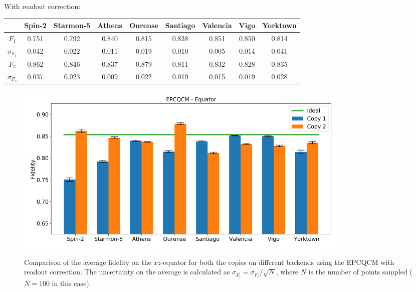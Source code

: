 With readout correction:
\begin{table}[H]
    \centering
    \begin{tabular}{|c|c|c|c|c|c|c|c|c|}
    \hline
    \textbf{} & \textbf{Spin-2} & \textbf{Starmon-5} & \textbf{Athens} & \textbf{Ourense} & \textbf{Santiago} & \textbf{Valencia} & \textbf{Vigo} & \textbf{Yorktown} \\ \hline
    $F_1$              & 0.751 & 0.792 & 0.840 & 0.815 & 0.838 & 0.851 & 0.850 & 0.814 \\ \hline
    $\sigma_{F_1}$     & 0.042 & 0.022 & 0.011 & 0.019 & 0.010 & 0.005 & 0.014 & 0.041 \\ \hline
    $F_2$              & 0.862 & 0.846 & 0.837 & 0.879 & 0.811 & 0.832 & 0.828 & 0.835 \\ \hline
    $\sigma_{F_2}$     & 0.037 & 0.023 & 0.009 & 0.022 & 0.019 & 0.015 & 0.019 & 0.028 \\ \hline
    \end{tabular}
\end{table}
\begin{figure}[H]
  \centering
          \includegraphics[width=0.8\textwidth]{Figures/Economical/Histograms/histo_equator_corrected.png}
      \label{fig:epc_histo_equator_corrected}
      \caption{Comparison of the average fidelity on the $xz$-equator for both the copies on different backends using the EPCQCM with readout correction. The uncertainty on the average is calculated as $\sigma_{\overline{F}_i}=\sigma_{F_i}/\sqrt{N}$, where $N$ is the number of points sampled ($N=100$ in this case).}
\end{figure}

